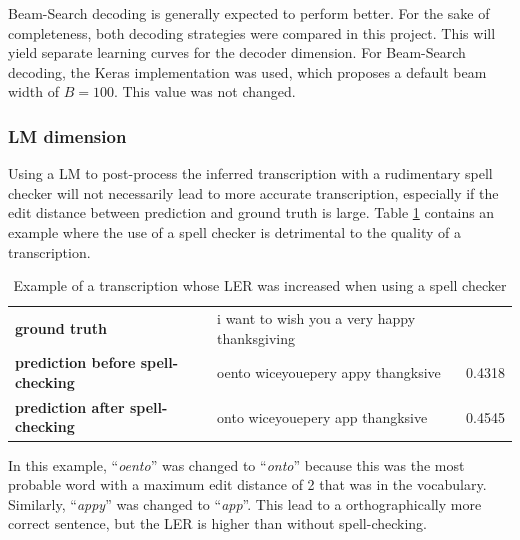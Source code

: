 Beam-Search decoding is generally expected to perform better. For the sake of completeness, both decoding strategies were compared in this project. This will yield separate learning curves for the decoder dimension. For Beam-Search decoding, the Keras implementation was used, which proposes a default beam width of $B=100$. This value was not changed. 

\subsubsection{LM dimension}

Using a \ac{LM} to post-process the inferred transcription with a rudimentary spell checker will not necessarily lead to more accurate transcription, especially if the edit distance between prediction and ground truth is large. Table \ref{lm_bad_example} contains an example where the use of a spell checker is detrimental to the quality of a transcription.

\begin{table}[!htbp]
	\centering
	\begin{tabular}{llr}
		\toprule
		 &  & \thead{\ac{LER}} \\
		\midrule
		\textbf{ground truth} & i want to wish you a very happy thanksgiving & \\ 
		\textbf{prediction before spell-checking} & oento wiceyouepery appy thangksive & 0.4318 \\ 
		\textbf{prediction after spell-checking} & onto wiceyouepery app thangksive & 0.4545 \\ 		
		\bottomrule
	\end{tabular}
	\caption{Example of a transcription whose \ac{LER} was increased when using a spell checker}
	\label{lm_bad_example}
\end{table}



In this example, \foreignquote{french}{\textit{oento}} was changed to \foreignquote{french}{\textit{onto}} because this was the most probable word with a maximum edit distance of 2 that was in the vocabulary. Similarly, \foreignquote{french}{\textit{appy}} was changed to \foreignquote{french}{\textit{app}}. This lead to a orthographically more correct sentence, but the \ac{LER} is higher than without spell-checking. 

